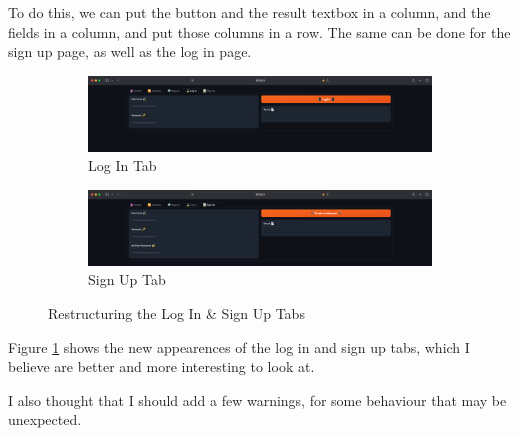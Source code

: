 \documentclass[12pt]{report}
\begin{document}
To do this, we can put the button and the result textbox in a column, and the fields in a column, and put those columns in a row. The same can be done for the sign up page, as well as the log in page.

\begin{figure}[H]
\centering
\begin{subfigure}{.8\textwidth}
    \centering
    \includegraphics[width=.9\linewidth]{ss22.13a.png}
    \caption{Log In Tab}
\end{subfigure}
\begin{subfigure}{.8\textwidth}
    \centering
    \includegraphics[width=.9\linewidth]{ss22.13b.png}
    \caption{Sign Up Tab}
\end{subfigure}
\caption{Restructuring the Log In \& Sign Up Tabs}\label{fig:restructureTabs}
\end{figure}

Figure \ref{fig:restructureTabs} shows the new appearences of the log in and sign up tabs, which I believe are better and more interesting to look at.

\begin{center}
\end{center}

I also thought that I should add a few warnings, for some behaviour that may be unexpected.
\end{document}
